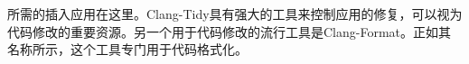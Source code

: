 所需的插入应用在这里。Clang-Tidy具有强大的工具来控制应用的修复，可以视为代码修改的重要资源。另一个用于代码修改的流行工具是Clang-Format。正如其名称所示，这个工具专门用于代码格式化。



























































































